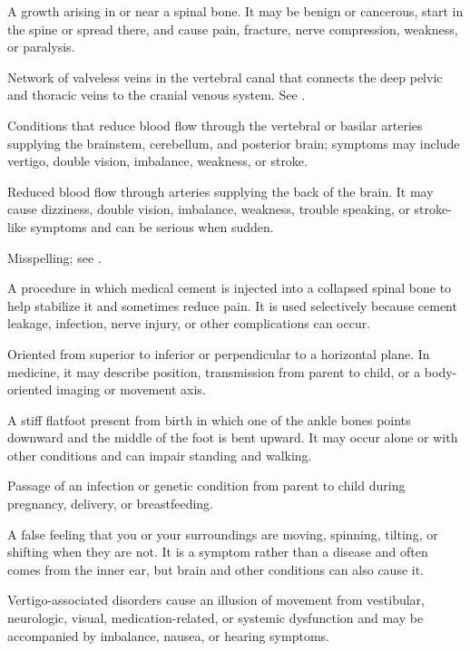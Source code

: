  A growth arising in or near a spinal bone. It may be benign or cancerous, start in the spine or spread there, and cause pain, fracture, nerve compression, weakness, or paralysis.

 Network of valveless veins in the vertebral canal that connects the deep pelvic and thoracic veins to the cranial venous system. See .

 Conditions that reduce blood flow through the vertebral or basilar arteries supplying the brainstem, cerebellum, and posterior brain; symptoms may include vertigo, double vision, imbalance, weakness, or stroke.

 Reduced blood flow through arteries supplying the back of the brain. It may cause dizziness, double vision, imbalance, weakness, trouble speaking, or stroke-like symptoms and can be serious when sudden.

 Misspelling; see .

 A procedure in which medical cement is injected into a collapsed spinal bone to help stabilize it and sometimes reduce pain. It is used selectively because cement leakage, infection, nerve injury, or other complications can occur.

 Oriented from superior to inferior or perpendicular to a horizontal plane. In medicine, it may describe position, transmission from parent to child, or a body-oriented imaging or movement axis.

 A stiff flatfoot present from birth in which one of the ankle bones points downward and the middle of the foot is bent upward. It may occur alone or with other conditions and can impair standing and walking.

 Passage of an infection or genetic condition from parent to child during pregnancy, delivery, or breastfeeding.

 A false feeling that you or your surroundings are moving, spinning, tilting, or shifting when they are not. It is a symptom rather than a disease and often comes from the inner ear, but brain and other conditions can also cause it.

 Vertigo-associated disorders cause an illusion of movement from vestibular, neurologic, visual, medication-related, or systemic dysfunction and may be accompanied by imbalance, nausea, or hearing symptoms.

